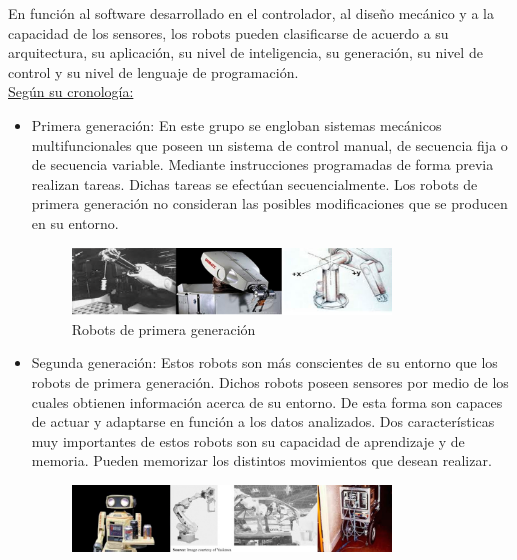 En función al software desarrollado en el controlador, al diseño mecánico y a la capacidad de los sensores, los robots pueden clasificarse de acuerdo a su arquitectura, su aplicación, su nivel de inteligencia, su generación, su nivel de control y su nivel de lenguaje de programación.\\

\underline{Según su cronología:} 
\begin{itemize}
  \item Primera generación: En este grupo se engloban sistemas mecánicos multifuncionales que poseen un sistema de control manual, de secuencia fija o de secuencia variable. Mediante instrucciones programadas de forma previa realizan tareas. Dichas tareas se efectúan secuencialmente. Los robots de primera generación no consideran las posibles modificaciones que se producen en su entorno.\\ 
	\begin{figure}[H]
  \begin{center}
    \includegraphics[width=0.8\textwidth]{figures/Introduccion/primera_generacion.png}
		\caption{Robots de primera generación}
		\label{fig.primera_generacion}
		\end{center}
\end{figure}
	\item Segunda generación: Estos robots son más conscientes de su entorno que los robots de primera generación. Dichos robots poseen sensores por medio de los cuales obtienen información acerca de su entorno. De esta forma son capaces de actuar y adaptarse en función a los datos analizados. Dos características muy importantes de estos robots son su capacidad de aprendizaje y de memoria. Pueden memorizar los distintos movimientos que desean realizar.\\
	\begin{figure}[H]
  \begin{center}
    \includegraphics[width=0.8\textwidth]{figures/Introduccion/segunda_generacion.png}

\end{center}
\end{figure}
\end{itemize}
